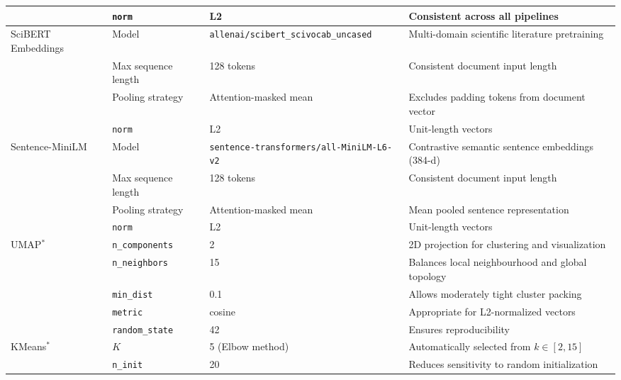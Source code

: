 \documentclass[a4paper,10pt,conference]{IEEEtran}
\begin{document}
\begin{table}[t]
{\begin{tabular}{@{}lllp{8cm}@{}}
                     & \texttt{norm}                    & L2                          & Consistent across all pipelines \\
\midrule
SciBERT Embeddings   & Model                            & \texttt{allenai/scibert\_scivocab\_uncased} & Multi-domain scientific literature pretraining \\
                     & Max sequence length              & 128 tokens                  & Consistent document input length \\
                     & Pooling strategy                 & Attention-masked mean       & Excludes padding tokens from document vector \\
                     & \texttt{norm}                    & L2                          & Unit-length vectors \\
\midrule
Sentence-MiniLM      & Model                            & \texttt{sentence-transformers/all-MiniLM-L6-v2} & Contrastive semantic sentence embeddings (384-d) \\
                     & Max sequence length              & 128 tokens                  & Consistent document input length \\
                     & Pooling strategy                 & Attention-masked mean       & Mean pooled sentence representation \\
                     & \texttt{norm}                    & L2                          & Unit-length vectors \\
\midrule
UMAP$^{*}$          & \texttt{n\_components}           & 2                           & 2D projection for clustering and visualization \\
                     & \texttt{n\_neighbors}            & 15                          & Balances local neighbourhood and global topology \\
                     & \texttt{min\_dist}               & 0.1                         & Allows moderately tight cluster packing \\
                     & \texttt{metric}                  & cosine                      & Appropriate for L2-normalized vectors \\
                     & \texttt{random\_state}           & 42                          & Ensures reproducibility \\
\midrule
KMeans$^{*}$        & $K$                              & 5 (Elbow method)            & Automatically selected from $k \in [2,15]$ \\
                     & \texttt{n\_init}                 & 20                          & Reduces sensitivity to random initialization \\

\end{tabular}}
\end{table}
\end{document}
